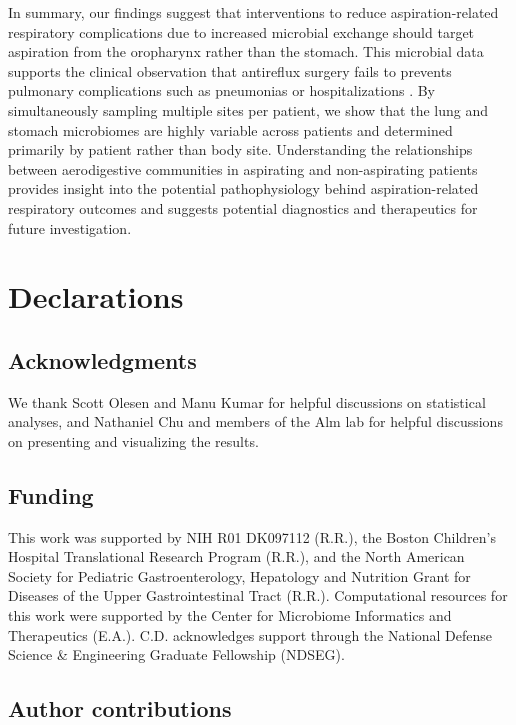 In summary, our findings suggest that interventions to reduce aspiration-related respiratory complications due to increased microbial exchange should target aspiration from the oropharynx rather than the stomach.
This microbial data supports the clinical observation that antireflux surgery fails to prevents pulmonary complications such as pneumonias or hospitalizations \cite{barnhart2013fundo,lee2008fundo,goldin2006fundo,yeh2016,srivastava2009fundo}.
By simultaneously sampling multiple sites per patient, we show that the lung and stomach microbiomes are highly variable across patients and determined primarily by patient rather than body site.
Understanding the relationships between aerodigestive communities in aspirating and non-aspirating patients provides insight into the potential pathophysiology behind aspiration-related respiratory outcomes and suggests potential diagnostics and therapeutics for future investigation.

\section{Declarations}

\subsection{Acknowledgments}

We thank Scott Olesen and Manu Kumar for helpful discussions on statistical analyses, and Nathaniel Chu and members of the Alm lab for helpful discussions on presenting and visualizing the results.

\subsection{Funding}

This work was supported by NIH R01 DK097112 (R.R.), the Boston Children's Hospital Translational Research Program (R.R.), and the North American Society for Pediatric Gastroenterology, Hepatology and Nutrition Grant for Diseases of the Upper Gastrointestinal Tract (R.R.).
Computational resources for this work were supported by the Center for Microbiome Informatics and Therapeutics (E.A.).
C.D. acknowledges support through the National Defense Science \& Engineering Graduate Fellowship (NDSEG).

\subsection{Author contributions}

